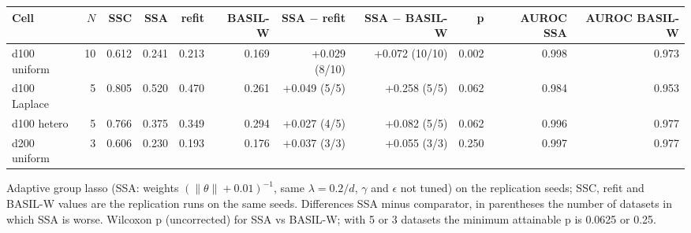 \begin{adjustbox}{max width=\textwidth}
\begin{tabular}{lrrrrrrrrrr}
\toprule
Cell & $N$ & SSC & SSA & refit & BASIL-W & SSA $-$ refit & SSA $-$ BASIL-W & p & AUROC SSA & AUROC BASIL-W \\
\midrule
d100 uniform & 10 & 0.612 & 0.241 & 0.213 & 0.169 & +0.029 (8/10) & +0.072 (10/10) & 0.002 & 0.998 & 0.973 \\
d100 Laplace & 5 & 0.805 & 0.520 & 0.470 & 0.261 & +0.049 (5/5) & +0.258 (5/5) & 0.062 & 0.984 & 0.953 \\
d100 hetero & 5 & 0.766 & 0.375 & 0.349 & 0.294 & +0.027 (4/5) & +0.082 (5/5) & 0.062 & 0.996 & 0.977 \\
d200 uniform & 3 & 0.606 & 0.230 & 0.193 & 0.176 & +0.037 (3/3) & +0.055 (3/3) & 0.250 & 0.997 & 0.977 \\
\bottomrule
\end{tabular}
\end{adjustbox}

\smallskip
{\footnotesize Adaptive group lasso (SSA: weights $(\|\theta\|+0.01)^{-1}$, same $\lambda=0.2/d$, $\gamma$ and $\epsilon$ not tuned) on the replication seeds; SSC, refit and BASIL-W values are the replication runs on the same seeds. Differences SSA minus comparator, in parentheses the number of datasets in which SSA is worse. Wilcoxon p (uncorrected) for SSA vs BASIL-W; with 5 or 3 datasets the minimum attainable p is 0.0625 or 0.25.}
